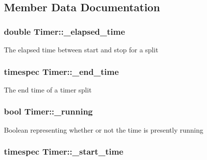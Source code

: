 \subsection{Member Data Documentation}
\hypertarget{classTimer_ab03f4401286530b40bdc8ec65e98b5cf}{
\subsubsection[{\-\_\-elapsed\-\_\-time}]{\setlength{\rightskip}{0pt plus 5cm}double Timer\-::\-\_\-elapsed\-\_\-time\hspace{0.3cm}{\ttfamily [protected]}}}\label{classTimer_ab03f4401286530b40bdc8ec65e98b5cf}
The elapsed time between start and stop for a split \hypertarget{classTimer_a8263ea8a07c2e7b18fcc2a14ba6975e6}{
\subsubsection[{\-\_\-end\-\_\-time}]{\setlength{\rightskip}{0pt plus 5cm}timespec Timer\-::\-\_\-end\-\_\-time\hspace{0.3cm}{\ttfamily [protected]}}}\label{classTimer_a8263ea8a07c2e7b18fcc2a14ba6975e6}
The end time of a timer split \hypertarget{classTimer_a0e92367e8b9f4fe50e7395d01db259af}{
\subsubsection[{\-\_\-running}]{\setlength{\rightskip}{0pt plus 5cm}bool Timer\-::\-\_\-running\hspace{0.3cm}{\ttfamily [protected]}}}\label{classTimer_a0e92367e8b9f4fe50e7395d01db259af}
Boolean representing whether or not the time is presently running \hypertarget{classTimer_a6f90c97bbab6f9f68249027e5705e7f0}{
\subsubsection[{\-\_\-start\-\_\-time}]{\setlength{\rightskip}{0pt plus 5cm}timespec Timer\-::\-\_\-start\-\_\-time\hspace{0.3cm}{\ttfamily [protected]}}}\label{classTimer_a6f90c97bbab6f9f68249027e5705e7f0}
